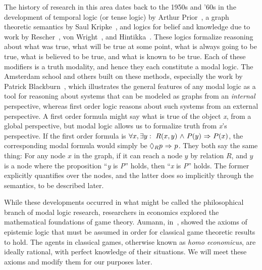The history of research in this area dates back to the 1950s and '60s in the development of temporal logic (or tense logic) by Arthur Prior~\cite{Prior}, a graph theoretic semantics by Saul Kripke~\cite{Kripke}, and logics for belief and knowledge due to work by Rescher~\cite{rescher}, von Wright~\cite{vonWright}, and Hintikka~\cite{Hintikka}. These logics formalize reasoning about what was true, what will be true at some point, what is always going to be true, what is believed to be true, and what is known to be true. Each of these modifiers is a truth modality, and hence they each constitute a modal logic. The Amsterdam school and others built on these methods, especially the work by Patrick Blackburn~\cite{modal}, which illustrates the general features of any modal logic as a tool for reasoning about systems that can be modeled as graphs from an \emph{internal} perspective, whereas first order logic reasons about such systems from an external perspective. A first order formula might say what is true of the object \emph{x}, from a global perspective, but modal logic allows us to formalize truth from \emph{x}'s perspective. If the first order formula is $\forall x, \exists y:\ R(x,y) {\ \wedge \ } P(y) {\ \Rightarrow \ } P(x)$, the corresponding modal formula would simply be $\Diamond_{R} p {\ \Rightarrow \ } p$. They both say the same thing: For any node $x$ in the graph, if it can reach a node $y$ by relation $R$, and $y$ is a node where the proposition ``\emph{y} is \emph{P}'' holds, then ``\emph{x} is \emph{P}'' holds. The former explicitly quantifies over the nodes, and the latter does so implicitly through the semantics, to be described later.

While these developments occurred in what might be called the philosophical branch of modal logic research, researchers in economics explored the mathematical foundations of game theory. Aumann, in~\cite{Aumann}, showed the axioms of epistemic logic that must be assumed in order for classical game theoretic results to hold. The agents in classical games, otherwise known as \emph{homo economicus}, are ideally rational, with perfect knowledge of their situations. We will meet these axioms and modify them for our purposes later.


